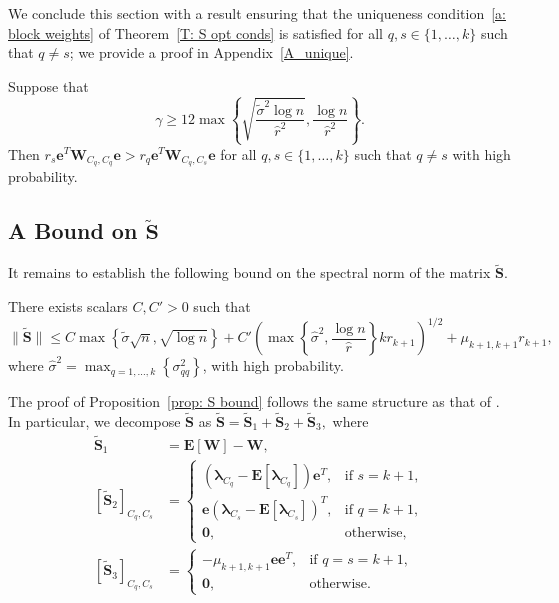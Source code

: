 \documentclass[twoside,11pt]{article}
\newcommand{\E}{\mathbf{E}}
\newcommand{\St}{\bs{\tilde S}}
\newcommand{\e}{\bs {e}}
\newcommand{\bs}{\boldsymbol}
\newcommand{\W}{\bs {W}}
\newcommand{\0}{\bs{0}}
\newcommand{\sbra}[1] {\ensuremath{ \left[ #1\right]}} %
\newcommand{\rbra}[1]{\ensuremath{\left( #1 \right)}} %
\newcommand{\bra}[1]{\ensuremath{\left\{ #1 \right\}}} %
\begin{document}
{%
We conclude this section with a result ensuring that the uniqueness condition~\eqref{a: block weights} of
Theorem~\ref{T: S opt conds}
is satisfied for all \(q, s\in \{1,\dots, k\}\) such that \(q \neq s\);
we provide a proof in Appendix~\ref{A_unique}.

\begin{proposition}
\label{prop:unique}%
	Suppose that
	\begin{equation} \label{eq: unique bound}
		\gamma \ge
		12 \max \bra{ \sqrt{ \frac{\tilde \sigma^2 \log n}{\hat r^2}},
		\frac{\log n}{\hat r^2} }.
	\end{equation}
	Then \(r_s \e^T \W_{C_q, C_q} \e > r_q \e^T \W_{C_q, C_s} \e \)
	for all \(q,s \in \{1,\dots, k\}\) such that \(q \neq s\) with high probability.
\end{proposition}

\subsection{A Bound on \(\bs{\tilde S}\)}
\label{sec: S}
It remains to establish the following bound on the spectral norm of the matrix \(\St\).

\begin{proposition} \label{prop: S bound}
	There exists scalars $C, C' > 0$ such that
	\begin{equation} \label{eq: S bound}
	\|\St\| \leq C   \max  \bra {\tilde \sigma\sqrt{n},  \sqrt{\log n}}
	+ C' \rbra{ \max \bra{\hat\sigma^2, \frac{\log n}{\hat r} } k r_{k+1} }^{1/2}
	+ \mu_{k+1, k+1} r_{k+1},
\end{equation}
	where $\hat \sigma^2 = \max_{q=1,\dots,k}\bra{\sigma^{2}_{qq}}$,
	with high probability.
\end{proposition}

The proof of Proposition~\ref{prop: S bound} follows the same structure as that of  \citet[Lemma~4.5]{ames2014guaranteed}.
In particular, we decompose \(\St\) as \(\St = \St_1 + \St_2 + \St_3,\) where
\begin{align}
\St_1 & = \E[ \W ] - \W,  \label{eq: St1 def}\\
[\St_2]_{C_q, C_s} & =
\begin{cases}  \left(\bs{\lambda}_{C_q}-\E\sbra{\bs{\lambda}_{C_q}}\right)\bs{e}^T,
& \mbox{if } s = k+1, \\
\bs{e}\left(\bs{\lambda}_{C_s}-\E\sbra{\bs{\lambda}_{C_s}}\right)^T, & \mbox{if } q = k+1,  \\
\bs{0}, & \mbox{otherwise, }\end{cases} \label{eq: St2 def} \\
[\St_3]_{C_q, C_s} &= 	\begin{cases} -\mu_{k+1, k+1} \bs{e}\bs{e}^T, & \mbox{if } q=s=k+1, \\
\bs{0}, & \mbox{otherwise.} \end{cases}
\end{align}

}
\end{document}
